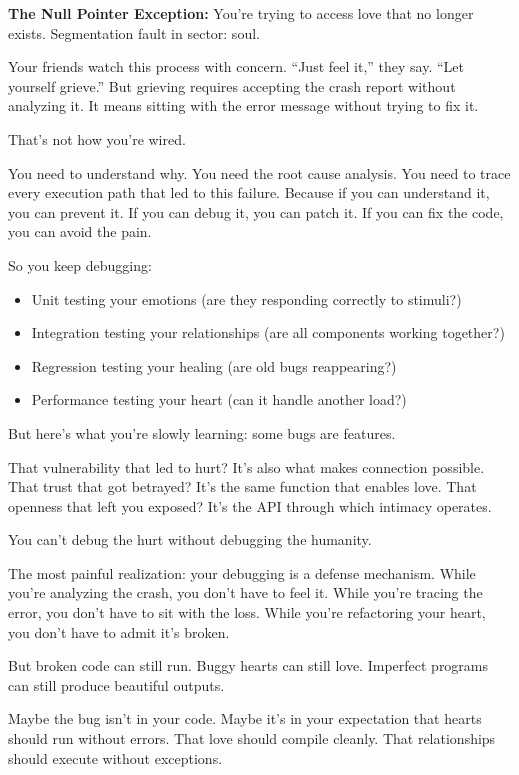 \documentclass[12pt,letterpaper]{book}
\begin{document}
\textbf{The Null Pointer Exception:} You're trying to access love that no longer exists. Segmentation fault in sector: soul.

Your friends watch this process with concern. ``Just feel it,'' they say. ``Let yourself grieve.'' But grieving requires accepting the crash report without analyzing it. It means sitting with the error message without trying to fix it.

That's not how you're wired.

You need to understand why. You need the root cause analysis. You need to trace every execution path that led to this failure. Because if you can understand it, you can prevent it. If you can debug it, you can patch it. If you can fix the code, you can avoid the pain.

So you keep debugging:

\begin{itemize}
\item Unit testing your emotions (are they responding correctly to stimuli?)
\item Integration testing your relationships (are all components working together?)
\item Regression testing your healing (are old bugs reappearing?)
\item Performance testing your heart (can it handle another load?)
\end{itemize}

But here's what you're slowly learning: some bugs are features.

That vulnerability that led to hurt? It's also what makes connection possible. That trust that got betrayed? It's the same function that enables love. That openness that left you exposed? It's the API through which intimacy operates.

You can't debug the hurt without debugging the humanity.

The most painful realization: your debugging is a defense mechanism. While you're analyzing the crash, you don't have to feel it. While you're tracing the error, you don't have to sit with the loss. While you're refactoring your heart, you don't have to admit it's broken.

But broken code can still run. Buggy hearts can still love. Imperfect programs can still produce beautiful outputs.

Maybe the bug isn't in your code. Maybe it's in your expectation that hearts should run without errors. That love should compile cleanly. That relationships should execute without exceptions.
\end{document}
